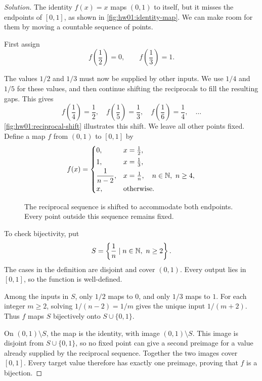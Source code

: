 
\begin{proof}[Solution]
The identity $f(x)=x$ maps $(0,1)$ to itself, but it misses the
endpoints of $[0,1]$, as shown in \autoref{fig:hw01:identity-map}.
We can make room for them by moving a countable sequence of points.

First assign
\[
  f\left(\frac12\right)=0,
  \qquad f\left(\frac13\right)=1.
\]
\begin{marginfigure}[12pt]
  \centering
  
  \caption[The identity misses the endpoints.]{The identity on $(0,1)$ misses the target values $0$ and $1$.
    Both endpoints of the graph are excluded.}
  \label{fig:hw01:identity-map}
\end{marginfigure}

The values $1/2$ and $1/3$ must now be supplied by other inputs.
We use $1/4$ and $1/5$ for these values, and then continue shifting
the reciprocals to fill the resulting gaps. This gives
\[
  f\left(\frac14\right)=\frac12,\quad
  f\left(\frac15\right)=\frac13,\quad
  f\left(\frac16\right)=\frac14,\quad\ldots
\]
\autoref{fig:hw01:reciprocal-shift} illustrates this shift.
We leave all other points fixed. Define a map $f$ from $(0,1)$
to $[0,1]$ by
\[
  f(x)=
  \begin{cases}
    0, & x=\frac12,\\[2pt]
    1, & x=\frac13,\\[2pt]
    \dfrac1{n-2}, & x=\frac1n,\quad n\in\mathbb{N},\ n\ge4,\\[4pt]
    x, & \text{otherwise}.
  \end{cases}
\]

\begin{figure}[h]
  \centering
  
  \caption[Shifting a reciprocal sequence.]{The reciprocal sequence is shifted to accommodate both
    endpoints. Every point outside this sequence remains fixed.}
  \label{fig:hw01:reciprocal-shift}
\end{figure}

To check bijectivity, put
\[
  S=\left\{\frac1n\mid n\in\N,\ n\ge2\right\}.
\]
The cases in the definition are disjoint and cover $(0,1)$.
Every output lies in $[0,1]$, so the function is well-defined.

Among the inputs in $S$, only $1/2$ maps to $0$, and only $1/3$
maps to $1$. For each integer $m\ge2$, solving $1/(n-2)=1/m$
gives the unique input $1/(m+2)$. Thus $f$ maps $S$ bijectively
onto $S\cup\{0,1\}$.

On $(0,1)\setminus S$, the map is the identity, with image
$(0,1)\setminus S$. This image is disjoint from $S\cup\{0,1\}$,
so no fixed point can give a second preimage for a value already
supplied by the reciprocal sequence. Together the two images
cover $[0,1]$. Every target value therefore has exactly one
preimage, proving that $f$ is a bijection.
\end{proof}
